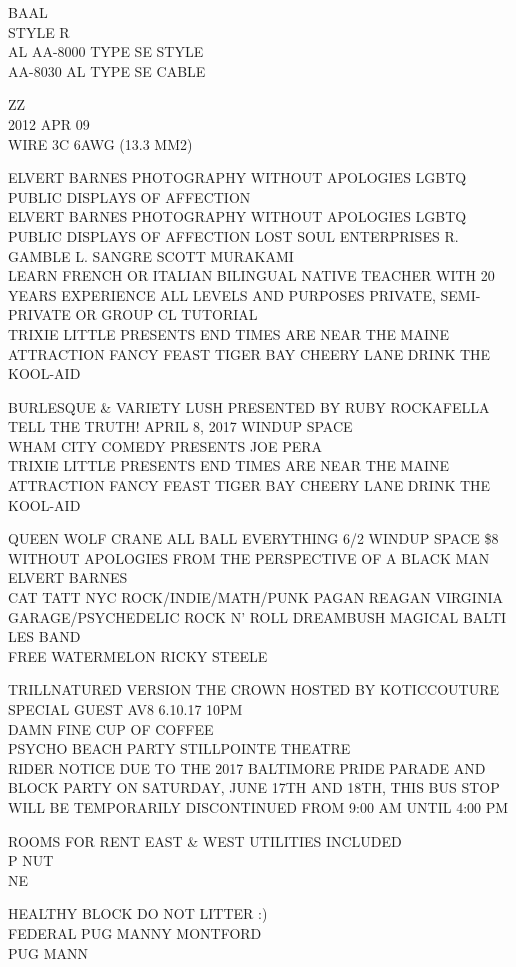\documentclass[10pt,letterpaper]{article}
\begin{document}
BAAL\\
STYLE R\\
AL AA{-}8000 TYPE SE STYLE\\
AA{-}8030 AL TYPE SE CABLE

ZZ\\
2012 APR 09\\
WIRE 3C 6AWG (13.3 MM2)

ELVERT BARNES PHOTOGRAPHY WITHOUT APOLOGIES LGBTQ PUBLIC DISPLAYS OF AFFECTION\\
ELVERT BARNES PHOTOGRAPHY WITHOUT APOLOGIES LGBTQ PUBLIC DISPLAYS OF AFFECTION LOST SOUL ENTERPRISES R. GAMBLE L. SANGRE SCOTT MURAKAMI\\
LEARN FRENCH OR ITALIAN BILINGUAL NATIVE TEACHER WITH 20 YEARS EXPERIENCE ALL LEVELS AND PURPOSES PRIVATE, SEMI{-}PRIVATE OR GROUP CL TUTORIAL\\
TRIXIE LITTLE PRESENTS END TIMES ARE NEAR THE MAINE ATTRACTION FANCY FEAST TIGER BAY CHEERY LANE DRINK THE KOOL{-}AID

BURLESQUE \& VARIETY LUSH PRESENTED BY RUBY ROCKAFELLA\\
TELL THE TRUTH! APRIL 8, 2017 WINDUP SPACE\\
WHAM CITY COMEDY PRESENTS JOE PERA\\
TRIXIE LITTLE PRESENTS END TIMES ARE NEAR THE MAINE ATTRACTION FANCY FEAST TIGER BAY CHEERY LANE DRINK THE KOOL{-}AID

QUEEN WOLF CRANE ALL BALL EVERYTHING 6/2 WINDUP SPACE \$8\\
WITHOUT APOLOGIES FROM THE PERSPECTIVE OF A BLACK MAN ELVERT BARNES\\
CAT TATT NYC ROCK/INDIE/MATH/PUNK PAGAN REAGAN VIRGINIA GARAGE/PSYCHEDELIC ROCK N' ROLL DREAMBUSH MAGICAL BALTI LES BAND\\
FREE WATERMELON RICKY STEELE

TRILLNATURED VERSION THE CROWN HOSTED BY KOTICCOUTURE SPECIAL GUEST AV8 6.10.17 10PM\\
DAMN FINE CUP OF COFFEE\\
PSYCHO BEACH PARTY STILLPOINTE THEATRE\\
RIDER NOTICE DUE TO THE 2017 BALTIMORE PRIDE PARADE AND BLOCK PARTY ON SATURDAY, JUNE 17TH AND 18TH, THIS BUS STOP WILL BE TEMPORARILY DISCONTINUED FROM 9:00 AM UNTIL 4:00 PM

ROOMS FOR RENT EAST \& WEST UTILITIES INCLUDED\\
P NUT\\
NE

HEALTHY BLOCK DO NOT LITTER :)\\
FEDERAL PUG MANNY MONTFORD\\
PUG MANN
\end{document}
